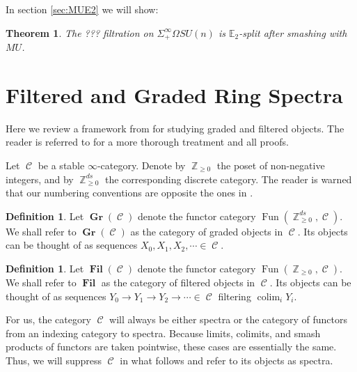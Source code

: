 \documentclass[oneside]{amsart}
\theoremstyle{definition}
\newtheorem{dfn}[nul]{Definition}
\theoremstyle{plain}
\newtheorem{thm}[nul]{Theorem}
\DeclareMathOperator*{\colim}{\text{colim}}
\DeclareMathOperator{\C}{\mathcal{C}}
\DeclareMathOperator{\Z}{\mathbb{Z}}
\DeclareMathOperator{\Gr}{\textbf{Gr}}
\DeclareMathOperator{\Fil}{\textbf{Fil}}
\DeclareMathOperator{\Fun}{\text{Fun}}
\begin{document}
In section \ref{sec:MUE2} we will show:
\begin{thm}
The ??? filtration on $\Sigma^{\infty}_+ \Omega SU(n)$ is $\mathbb{E}_2$-split after smashing with $MU$.
\end{thm}




\section{Filtered and Graded Ring Spectra} \label{sec:FilGra}


Here we review a framework from \cite{LurieRot} for studying graded and filtered objects.  The reader is referred to \cite{LurieRot} for a more thorough treatment and all proofs.  

Let $\C$ be a stable $\infty$-category.  Denote by $\Z_{\geq 0}$ the poset of non-negative integers, and by $\Z_{\geq 0}^{ds}$ the corresponding discrete category.  The reader is warned that our numbering conventions are opposite the ones in \cite{LurieRot}.

\begin{dfn} 
Let $\Gr(\C)$ denote the functor category $\Fun(\Z_{\geq 0}^{ds}, \C).$  We shall refer to $\Gr(\C)$ as the category of graded objects in $\C$.  Its objects can be thought of as sequences $X_0, X_1,X_2,\cdots \in \C$.
\end{dfn}

 \begin{dfn} 
Let $\Fil(\C)$ denote the functor category $\Fun(\Z_{\geq 0}, \C).$  We shall refer to $\Fil$ as the category of filtered objects in $\C$.  Its objects can be thought of as sequences $Y_0\to Y_1\to Y_2 \to \cdots \in \C$ filtering $\colim_i Y_i$.  
 \end{dfn}
 
 For us, the category $\C$ will always be either spectra or the category of functors from an indexing category to spectra.  Because limits, colimits, and smash products of functors are taken pointwise, these cases are essentially the same.  Thus, we will suppress $\C$ in what follows and refer to its objects as spectra.
\end{document}
